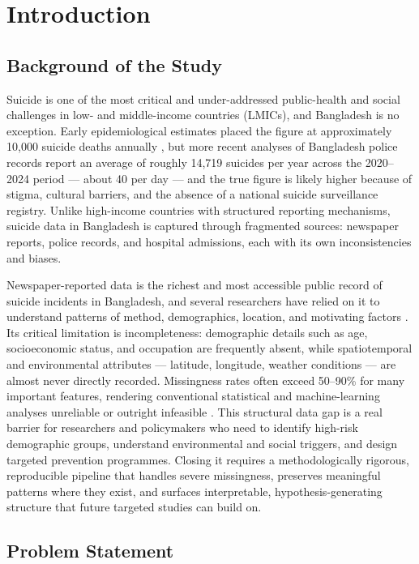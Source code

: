 \chapter{Introduction}

\section{Background of the Study}

Suicide is one of the most critical and under-addressed public-health and social challenges in low- and middle-income countries (LMICs), and Bangladesh is no exception. Early epidemiological estimates placed the figure at approximately 10,000 suicide deaths annually \cite{ref1,ref50}, but more recent analyses of Bangladesh police records report an average of roughly 14,719 suicides per year across the 2020--2024 period --- about 40 per day \cite{ref3} --- and the true figure is likely higher because of stigma, cultural barriers, and the absence of a national suicide surveillance registry. Unlike high-income countries with structured reporting mechanisms, suicide data in Bangladesh is captured through fragmented sources: newspaper reports, police records, and hospital admissions, each with its own inconsistencies and biases.

Newspaper-reported data is the richest and most accessible public record of suicide incidents in Bangladesh, and several researchers have relied on it to understand patterns of method, demographics, location, and motivating factors \cite{ref51,ref50}. Its critical limitation is incompleteness: demographic details such as age, socioeconomic status, and occupation are frequently absent, while spatiotemporal and environmental attributes --- latitude, longitude, weather conditions --- are almost never directly recorded. Missingness rates often exceed 50--90\% for many important features, rendering conventional statistical and machine-learning analyses unreliable or outright infeasible \cite{ref6,ref55}. This structural data gap is a real barrier for researchers and policymakers who need to identify high-risk demographic groups, understand environmental and social triggers, and design targeted prevention programmes. Closing it requires a methodologically rigorous, reproducible pipeline that handles severe missingness, preserves meaningful patterns where they exist, and surfaces interpretable, hypothesis-generating structure that future targeted studies can build on.

\section{Problem Statement}

